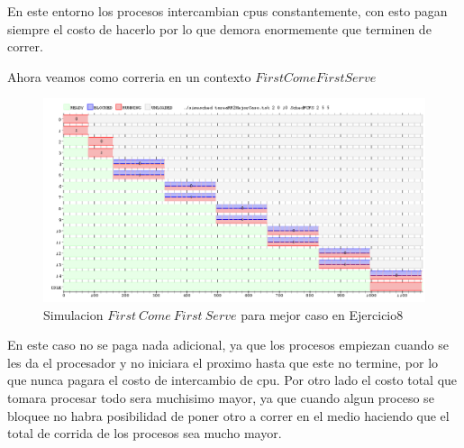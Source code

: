 \documentclass[11pt]{article}
\begin{document}
  En este entorno los procesos intercambian cpus constantemente, con esto pagan siempre el costo de hacerlo por lo que demora enormemente que terminen de correr.

  Ahora veamos como correria en un contexto $FirstComeFirstServe$


    \begin{figure}[H]
      \includegraphics[scale=0.5]{Ej8MejorCasoFCFS}
      \caption{Simulacion $First\ Come\ First\ Serve$ para mejor caso en Ejercicio8}
    \end{figure}

  En este caso no se paga nada adicional, ya que los procesos empiezan cuando se les da el procesador y no iniciara el proximo hasta que este no termine, por lo que nunca pagara el costo de intercambio de cpu. Por otro lado el costo total que tomara procesar todo sera muchisimo mayor, ya que cuando algun proceso se bloquee no habra posibilidad de poner otro a correr en el medio haciendo que el total de corrida de los procesos sea mucho mayor.

  
\end{document}

